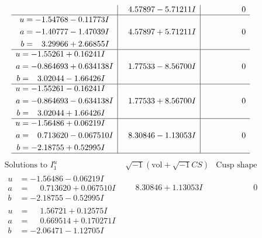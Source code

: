 \documentclass[1p]{elsarticle_modified}
\theoremstyle{definition}
\newcommand{\I}{\sqrt{-1}}
\begin{document}
$$\begin{array}{c|c|c}
 & \phantom{-}4.57897 - 5.71211 I & \phantom{-0.000000 } 0 \\ \hline\begin{aligned}
u &= -1.54768 - 0.11773 I \\
a &= -1.40777 - 1.47039 I \\
b &= \phantom{-}3.29966 + 2.66855 I\end{aligned}
 & \phantom{-}4.57897 + 5.71211 I & \phantom{-0.000000 } 0 \\ \hline\begin{aligned}
u &= -1.55261 + 0.16241 I \\
a &= -0.864693 + 0.634138 I \\
b &= \phantom{-}3.02044 - 1.66426 I\end{aligned}
 & \phantom{-}1.77533 - 8.56700 I & \phantom{-0.000000 } 0 \\ \hline\begin{aligned}
u &= -1.55261 - 0.16241 I \\
a &= -0.864693 - 0.634138 I \\
b &= \phantom{-}3.02044 + 1.66426 I\end{aligned}
 & \phantom{-}1.77533 + 8.56700 I & \phantom{-0.000000 } 0 \\ \hline\begin{aligned}
u &= -1.56486 + 0.06219 I \\
a &= \phantom{-}0.713620 - 0.067510 I \\
b &= -2.18755 + 0.52995 I\end{aligned}
 & \phantom{-}8.30846 - 1.13053 I & \phantom{-0.000000 } 0\\
 \hline 
 \end{array}$$\newpage$$\begin{array}{c|c|c}  
\text{Solutions to }I^u_{1}& \I (\text{vol} + \sqrt{-1}CS) & \text{Cusp shape}\\
 \hline 
\begin{aligned}
u &= -1.56486 - 0.06219 I \\
a &= \phantom{-}0.713620 + 0.067510 I \\
b &= -2.18755 - 0.52995 I\end{aligned}
 & \phantom{-}8.30846 + 1.13053 I & \phantom{-0.000000 } 0 \\ \hline\begin{aligned}
u &= \phantom{-}1.56721 + 0.12575 I \\
a &= \phantom{-}0.669514 + 0.170271 I \\
b &= -2.06471 - 1.12705 I\end{aligned}

\end{array}$$
\end{document}

